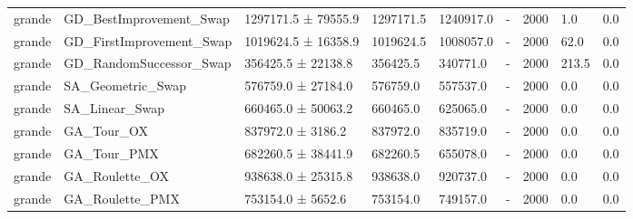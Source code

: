\begin{tabular}{lllllllll}
grande & GD_BestImprovement_Swap & 1297171.5 ± 79555.9 & 1297171.5 & 1240917.0 & - & 2000 & 1.0 & 0.0 \\
grande & GD_FirstImprovement_Swap & 1019624.5 ± 16358.9 & 1019624.5 & 1008057.0 & - & 2000 & 62.0 & 0.0 \\
grande & GD_RandomSuccessor_Swap & 356425.5 ± 22138.8 & 356425.5 & 340771.0 & - & 2000 & 213.5 & 0.0 \\
grande & SA_Geometric_Swap & 576759.0 ± 27184.0 & 576759.0 & 557537.0 & - & 2000 & 0.0 & 0.0 \\
grande & SA_Linear_Swap & 660465.0 ± 50063.2 & 660465.0 & 625065.0 & - & 2000 & 0.0 & 0.0 \\
grande & GA_Tour_OX & 837972.0 ± 3186.2 & 837972.0 & 835719.0 & - & 2000 & 0.0 & 0.0 \\
grande & GA_Tour_PMX & 682260.5 ± 38441.9 & 682260.5 & 655078.0 & - & 2000 & 0.0 & 0.0 \\
grande & GA_Roulette_OX & 938638.0 ± 25315.8 & 938638.0 & 920737.0 & - & 2000 & 0.0 & 0.0 \\
grande & GA_Roulette_PMX & 753154.0 ± 5652.6 & 753154.0 & 749157.0 & - & 2000 & 0.0 & 0.0 \\
\hline
\end{tabular}
